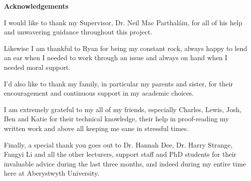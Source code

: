 \thispagestyle{empty}

\begin{center}
    {\LARGE\bf Acknowledgements}
\end{center}

I would like to thank my Supervisor, Dr. Neil Mac Parthal\'ain, for all of his help and unwavering guidance throughout this project.

Likewise I am thankful to Ryan for being my constant rock, always happy to lend an ear when I needed to work through an issue and always on hand when I needed moral support.

I'd also like to thank my family, in particular my parents and sister, for their encouragement and continuous support in my academic choices.

I am extremely grateful to my all of my friends, especially Charles, Lewis, Josh, Ben and Katie for their technical knowledge, their help in proof-reading my written work and above all keeping me sane in stressful times.

Finally, a special thank you goes out to Dr. Hannah Dee, Dr. Harry Strange, Fangyi Li and all the other lecturers, support staff and PhD students for their invaluable advice during the last three months, and indeed during my entire time here at Aberystwyth University.
